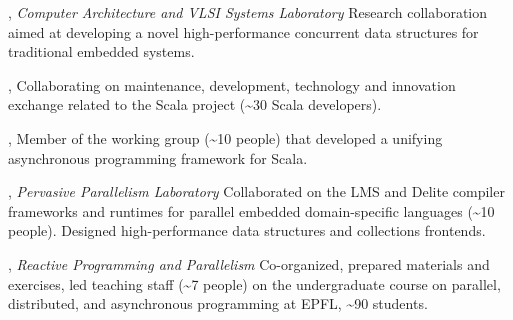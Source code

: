 \documentclass[9pt]{article}
\begin{document}
\textheight=580pt

\vspace{0.05in}

,
\newline\noindent
{\em Computer Architecture and VLSI Systems Laboratory}
\dates{}
\newline\noindent Research collaboration aimed at developing a novel high-performance
\newline\noindent concurrent data structures for traditional embedded systems.
\medskip

,
\newline\noindent Collaborating on maintenance, development, technology and innovation
\newline\noindent exchange related to the  Scala project
                  (\textasciitilde30 Scala developers).
\medskip

,
\newline\noindent Member of the working group (\textasciitilde10 people) that developed
                  a unifying
\newline\noindent asynchronous programming framework for Scala.
\medskip

,
\newline\noindent
{\em Pervasive Parallelism Laboratory}
\dates{}
\newline\noindent Collaborated on the LMS and Delite compiler frameworks and runtimes
\newline\noindent for parallel embedded domain-specific languages
                  (\textasciitilde10 people). Designed
\newline\noindent high-performance data structures and collections frontends.
\medskip


\medskip
{}

,
{\em Reactive Programming and Parallelism}
\newline\noindent Co-organized, prepared materials and exercises, led teaching staff
                  (\textasciitilde7 people)
\newline\noindent on the undergraduate course on parallel, distributed, and asynchronous
\newline\noindent programming at EPFL, \textasciitilde90 students.
\bigskip
\end{document}
